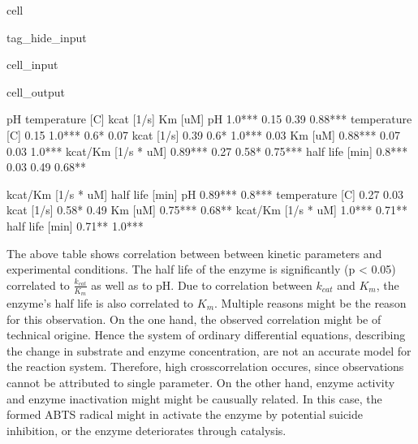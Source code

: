 \documentclass[letterpaper,10pt,english]{jupyterBook}
\begin{document}
\begin{sphinxuseclass}{cell}
\begin{sphinxuseclass}{tag_hide_input}
\begin{sphinxVerbatimInput}
\begin{sphinxuseclass}{cell_input}
\end{sphinxuseclass}\end{sphinxVerbatimInput}
\begin{sphinxVerbatimOutput}

\begin{sphinxuseclass}{cell_output}
\begin{sphinxVerbatim}[commandchars=\\\{\}]
                          pH temperature [C] kcat [1/s]   Km [uM]  \PYGZbs{}
pH                    1.0***           \PYGZhy{}0.15      \PYGZhy{}0.39   0.88***   
temperature [C]        \PYGZhy{}0.15          1.0***       0.6*      0.07   
kcat [1/s]             \PYGZhy{}0.39            0.6*     1.0***     \PYGZhy{}0.03   
Km [uM]              0.88***            0.07      \PYGZhy{}0.03    1.0***   
kcat/Km [1/s * uM]  \PYGZhy{}0.89***            0.27      0.58*  \PYGZhy{}0.75***   
half life [min]       0.8***            0.03      \PYGZhy{}0.49    0.68**   

                   kcat/Km [1/s * uM] half life [min]  
pH                           \PYGZhy{}0.89***          0.8***  
temperature [C]                  0.27            0.03  
kcat [1/s]                      0.58*           \PYGZhy{}0.49  
Km [uM]                      \PYGZhy{}0.75***          0.68**  
kcat/Km [1/s * uM]             1.0***         \PYGZhy{}0.71**  
half life [min]               \PYGZhy{}0.71**          1.0***  
\end{sphinxVerbatim}

\end{sphinxuseclass}\end{sphinxVerbatimOutput}

\end{sphinxuseclass}
\end{sphinxuseclass}
\sphinxAtStartPar
The above table shows correlation between between kinetic parameters and experimental conditions. The half life of the enzyme is significantly (p < 0.05) correlated to \(\frac{k_{cat}}{K_{m}}\) as well as to pH. Due to correlation between \(k_{cat}\) and \(K_{m}\), the enzyme’s half life is also correlated to \(K_{m}\). Multiple reasons might be the reason for this observation. On the one hand, the observed correlation might be of technical origine. Hence the system of ordinary differential equations, describing the change in substrate and enzyme concentration, are not an accurate model for the reaction system. Therefore, high cross\sphinxhyphen{}correlation occures, since observations cannot be attributed to single parameter. On the other hand, enzyme activity and enzyme inactivation might might be causually related. In this case, the formed ABTS radical might in activate the enzyme by potential suicide inhibition, or the enzyme deteriorates through catalysis.
\end{document}
